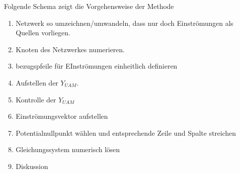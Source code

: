 \newline\newline
Folgende Schema zeigt die Vorgehensweise der Methode
\begin{enumerate}
\item Netzwerk so umzeichnen/umwandeln, dass nur doch Einströmungen als Quellen vorliegen.
\item Knoten des Netzwerkes numerieren.
\item bezugspfeile für EInströmungen einheitlich definieren
\item Aufstellen der $Y_{UAM}$.
\item Kontrolle der $Y_{UAM}$
\item Einströmungsvektor aufstellen
\item Potentialnullpunkt wählen und entsprechende Zeile und Spalte streichen
\item Gleichungssystem numerisch lösen
\item Diskussion
\end{enumerate}
